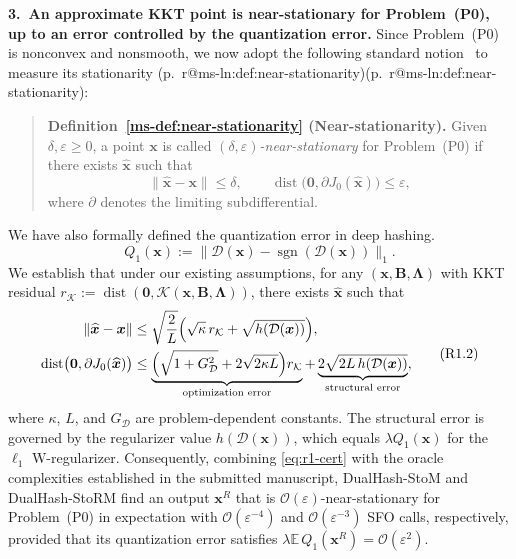 \documentclass[11pt]{article}
\makeatletter
\newcommand{\mref}[1]{\ref*{ms-#1}}
\newcommand{\mpage}[1]{\pageref*{ms-#1}}
\newcommand{\mhasline}[1]{\ifcsname r@ms-ln:#1\endcsname\expandafter\@firstoftwo\else\expandafter\@secondoftwo\fi}
\newcommand{\mline}[1]{\getrefnumber{ms-ln:#1}}
\newcommand{\mpl}[1]{p.~\mpage{#1}\mhasline{#1}{, line~\mline{#1}}{}}
\newcommand{\EE}{\mathbb{E}}
\newcommand{\dist}{\operatorname{dist}}
\newcommand{\zero}{\bm{0}}
\newcommand{\calD}{\mathcal{D}}
\newcommand{\calO}{\mathcal{O}}
\newcommand{\calK}{\mathcal{K}}
\newcommand{\bB}{\bm{B}}
\newcommand{\bLmbd}{\bm{\Lambda}}
\newcommand{\bx}{\bm{x}}
\newcommand{\blue}[1]{{\ifmmode\color{blue}#1\else\normalfont\upshape\color{blue}#1\fi}}
\newenvironment{bluequote}{\begin{quote}\normalfont\upshape\color{blue}}{\end{quote}}
\newcommand{\newred}[1]{{\color{red}#1}}
\newenvironment{qalist}{\begin{description}[leftmargin=0pt,labelindent=0pt,itemsep=0.8em,parsep=0.5em,font=\normalfont\upshape\bfseries]}{\end{description}}
\makeatother
\begin{document}
\begin{qalist}
\textbf{3.~An approximate KKT point is \newred{near-stationary for} Problem~(P0), up to an error controlled by the quantization error.} Since Problem~(P0) is nonconvex and nonsmooth, we now adopt the following standard notion~\cite{davis2019,tian2022stationarity} to measure its stationarity \blue{(\mpl{def:near-stationarity})}:
\begin{bluequote}
\textbf{Definition~\mref{def:near-stationarity} (Near-stationarity).} Given $\delta,\varepsilon\ge0$, a point $\bx$ is called \emph{$(\delta,\varepsilon)$-near-stationary} for Problem~(P0) if there exists $\widehat{\bx}$ such that
\[
\|\widehat{\bx}-\bx\|\le\delta,
\qquad
\dist\bigl(\zero,\partial J_0(\widehat{\bx})\bigr)\le\varepsilon,
\]
where $\partial$ denotes the limiting subdifferential.
\end{bluequote}
We have also formally defined the quantization error in deep hashing.
\[
Q_1(\bx):=\|\calD(\bx)-\operatorname{sgn}(\calD(\bx))\|_1.
\]
We establish that under our existing assumptions, for any $(\bx,\bB,\bLmbd)$ with KKT residual $r_{\calK}:=\dist(\zero,\calK(\bx,\bB,\bLmbd))$, there exists $\widehat{\bx}$ such that
\begin{equation}
\begin{aligned}
\|\widehat{\bx}-\bx\|
&\le\sqrt{\frac{2}{L}}\Bigl(\sqrt{\kappa}\,r_{\calK}+\sqrt{h(\calD(\bx))}\Bigr),\\
\dist\bigl(\zero,\partial J_0(\widehat{\bx})\bigr)
&\le\underbrace{\Bigl(\sqrt{1+G_{\calD}^2}+2\sqrt{2\kappa L}\Bigr)r_{\calK}}_{\text{optimization error}}
+\underbrace{2\sqrt{2L\,h(\calD(\bx))}}_{\text{structural error}},
\end{aligned}
\tag{R1.2}\label{eq:r1-cert}
\end{equation}
where \newred{$\kappa$, $L$, and $G_{\calD}$ are problem-dependent constants.} The structural error is governed by the regularizer value $h(\calD(\bx))$, which equals $\lambda Q_1(\bx)$ for the $\ell_1$ W-regularizer. Consequently, combining \eqref{eq:r1-cert} with the oracle complexities established in the submitted manuscript, DualHash-StoM and DualHash-StoRM find \newred{an output $\bx^R$} that is $\calO(\varepsilon)$-near-stationary for Problem~(P0) in expectation with $\calO(\varepsilon^{-4})$ and $\calO(\varepsilon^{-3})$ SFO calls, respectively, provided that its quantization error satisfies $\lambda\EE\,Q_1(\bx^R)=\calO(\varepsilon^2)$. 


\end{qalist}
\end{document}
